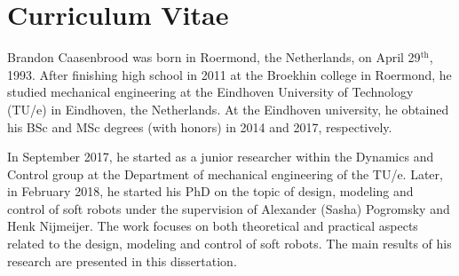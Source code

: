 \chapter*{Curriculum Vitae}


Brandon Caasenbrood was born in Roermond, the Netherlands, on April 29$^{\textrm{th}}$, 1993. After finishing high school in 2011 at the Broekhin college in Roermond, he studied mechanical engineering at the Eindhoven University of Technology (TU/e) in Eindhoven, the Netherlands. At the Eindhoven university, he obtained his BSc and MSc degrees (with honors) in 2014 and 2017, respectively. 

In September 2017, he started as a junior researcher within the Dynamics and Control group at the Department of mechanical engineering of the TU/e. Later, in February 2018, he started his PhD on the topic of design, modeling and control of soft robots under the supervision of Alexander (Sasha) Pogromsky and Henk Nijmeijer. The work focuses on both theoretical and practical aspects related to the design, modeling and control of soft robots. The main results of his research are presented in this dissertation.
